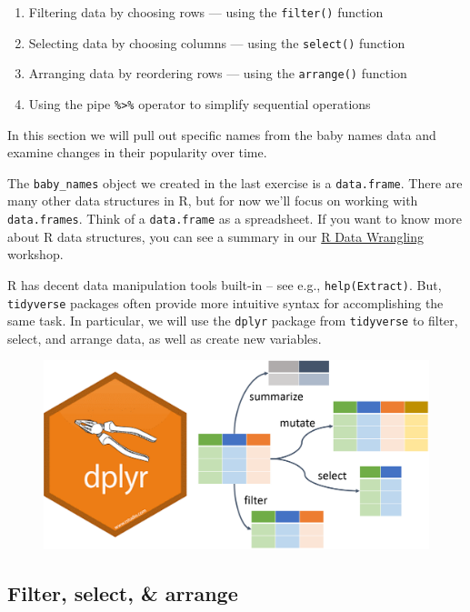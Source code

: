\documentclass[]{book}
\providecommand{\tightlist}{%
  \setlength{\itemsep}{0pt}\setlength{\parskip}{0pt}}
\begin{document}
\begin{enumerate}
\def\labelenumi{\arabic{enumi}.}
\tightlist
\item
  Filtering data by choosing rows --- using the \texttt{filter()}
  function
\item
  Selecting data by choosing columns --- using the \texttt{select()}
  function
\item
  Arranging data by reordering rows --- using the \texttt{arrange()}
  function
\item
  Using the pipe \texttt{\%\textgreater{}\%} operator to simplify
  sequential operations
\end{enumerate}

In this section we will pull out specific names from the baby names data
and examine changes in their popularity over time.

The \texttt{baby\_names} object we created in the last exercise is a
\texttt{data.frame}. There are many other data structures in R, but for
now we'll focus on working with \texttt{data.frames}. Think of a
\texttt{data.frame} as a spreadsheet. If you want to know more about R
data structures, you can see a summary in our
\href{./RDataWrangling.html\#data-types-and-structures}{R Data
Wrangling} workshop.

R has decent data manipulation tools built-in -- see e.g.,
\texttt{help(Extract)}. But, \texttt{tidyverse} packages often provide
more intuitive syntax for accomplishing the same task. In particular, we
will use the \texttt{dplyr} package from \texttt{tidyverse} to filter,
select, and arrange data, as well as create new variables.

\begin{figure}
\centering
\includegraphics{R/Rintro/images/dplyr.png}
\caption{}
\end{figure}

\subsection{Filter, select, \& arrange}\label{filter-select-arrange}
\end{document}
